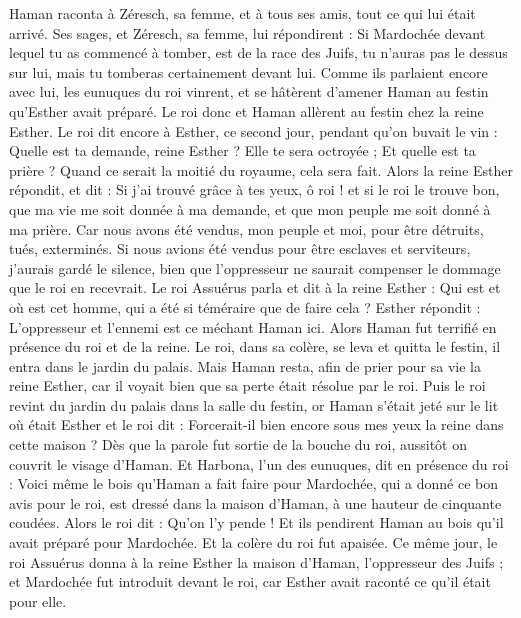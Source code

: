 \begin{multicols}{2}
Haman raconta à Zéresch, sa femme, et à tous ses amis, tout ce qui lui était arrivé. Ses sages, et Zéresch, sa femme, lui répondirent : Si Mardochée devant lequel tu as commencé à tomber, est de la race des Juifs, tu n'auras pas le dessus sur lui, mais tu tomberas certainement devant lui.
Comme ils parlaient encore avec lui, les eunuques du roi vinrent, et se hâtèrent d'amener Haman au festin qu'Esther avait préparé.
\VerseOne{}Le roi donc et Haman allèrent au festin chez la reine Esther.
Le roi dit encore à Esther, ce second jour, pendant qu’on buvait le vin : Quelle est ta demande, reine Esther ? Elle te sera octroyée ; Et quelle est ta prière ? Quand ce serait la moitié du royaume, cela sera fait.
Alors la reine Esther répondit, et dit : Si j'ai trouvé grâce à tes yeux, ô roi ! et si le roi le trouve bon, que ma vie me soit donnée à ma demande, et que mon peuple me soit donné à ma prière.
Car nous avons été vendus, mon peuple et moi, pour être détruits, tués, exterminés. Si nous avions été vendus pour être esclaves et serviteurs, j’aurais gardé le silence, bien que l'oppresseur ne saurait compenser le dommage que le roi en recevrait.
Le roi Assuérus parla et dit à la reine Esther : Qui est et où est cet homme, qui a été si téméraire que de faire cela ?
Esther répondit : L'oppresseur et l’ennemi est ce méchant Haman ici. Alors Haman fut terrifié en présence du roi et de la reine.
Le roi, dans sa colère, se leva et quitta le festin, il entra dans le jardin du palais. Mais Haman resta, afin de prier pour sa vie la reine Esther, car il voyait bien que sa perte était résolue par le roi.
Puis le roi revint du jardin du palais dans la salle du festin, or Haman s’était jeté sur le lit où était Esther et le roi dit : Forcerait-il bien encore sous mes yeux la reine dans cette maison ? Dès que la parole fut sortie de la bouche du roi, aussitôt on couvrit le visage d’Haman.
Et Harbona, l'un des eunuques, dit en présence du roi : Voici même le bois qu'Haman a fait faire pour Mardochée, qui a donné ce bon avis pour le roi, est dressé dans la maison d'Haman, à une hauteur de cinquante coudées. Alors le roi dit : Qu’on l'y pende !
Et ils pendirent Haman au bois qu'il avait préparé pour Mardochée. Et la colère du roi fut apaisée.
\VerseOne{}Ce même jour, le roi Assuérus donna à la reine Esther la maison d'Haman, l'oppresseur des Juifs ; et Mardochée fut introduit devant le roi, car Esther avait raconté ce qu’il était pour elle.

\end{multicols}
